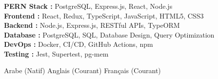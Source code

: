 \documentclass[11pt,a4paper]{article}
\begin{document}
{\small
\textbf{PERN Stack :} PostgreSQL, Express.js, React, Node.js\\[1.5pt]
\textbf{Frontend :} React, Redux, TypeScript, JavaScript, HTML5, CSS3\\[1.5pt]
\textbf{Backend :} Node.js, Express.js, RESTful APIs, TypeORM\\[1.5pt]
\textbf{Database :} PostgreSQL, SQL, Database Design, Query Optimization\\[1.5pt]
\textbf{DevOps :} Docker, CI/CD, GitHub Actions, npm\\[1.5pt]
\textbf{Testing :} Jest, Supertest, pg-mem
}

Arabe (Natif) \textbar{} Anglais (Courant) \textbar{} Français (Courant)

\end{document}
